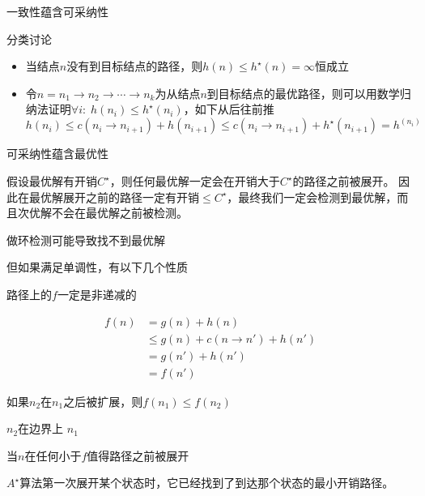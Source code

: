 \begin{theorem}
一致性蕴含可采纳性
\end{theorem}
\begin{analysis}
分类讨论
\begin{itemize}
	\item 当结点$n$没有到目标结点的路径，则$h(n)\leq h^\star(n)=\infty$恒成立
	\item 令$n=n_1\to n_2\to\cdots\to n_k$为从结点$n$到目标结点的最优路径，则可以用数学归纳法证明$\forall i:\;h(n_i)\leq h^\star(n_i)$，如下从后往前推
	\[h(n_{i})\leq c(n_i\to n_{i+1})+h(n_{i+1})\leq c(n_i\to n_{i+1}) + h^\star(n_{i+1})=h^(n_i)\]
\end{itemize}
\end{analysis}

\begin{theorem}
可采纳性蕴含最优性
\end{theorem}
\begin{analysis}
假设最优解有开销$C^\star$，则任何最优解一定会在开销大于$C^\star$的路径之前被展开。
因此在最优解展开之前的路径一定有开销$\leq C^\star$，最终我们一定会检测到最优解，而且次优解不会在最优解之前被检测。
\end{analysis}

做环检测可能导致找不到最优解

但如果满足单调性，有以下几个性质
\begin{proposition}
路径上的$f$一定是非递减的
\end{proposition}
\begin{analysis}
\[\begin{aligned}
f(n)&=g(n)+h(n)\\
&\leq g(n)+c(n\to n')+h(n')\\
&= g(n')+h(n')\\
&= f(n')
\end{aligned}\]
\end{analysis}

\begin{proposition}
如果$n_2$在$n_1$之后被扩展，则$f(n_1)\leq f(n_2)$
\end{proposition}
\begin{analysis}
$n_2$在边界上
$n_1$
\end{analysis}
\begin{proposition}
当$n$在任何小于$f$值得路径之前被展开
\end{proposition}
\begin{analysis}
\end{analysis}
\begin{proposition}
$A^\star$算法第一次展开某个状态时，它已经找到了到达那个状态的最小开销路径。
\end{proposition}
\begin{analysis}
\end{analysis}

